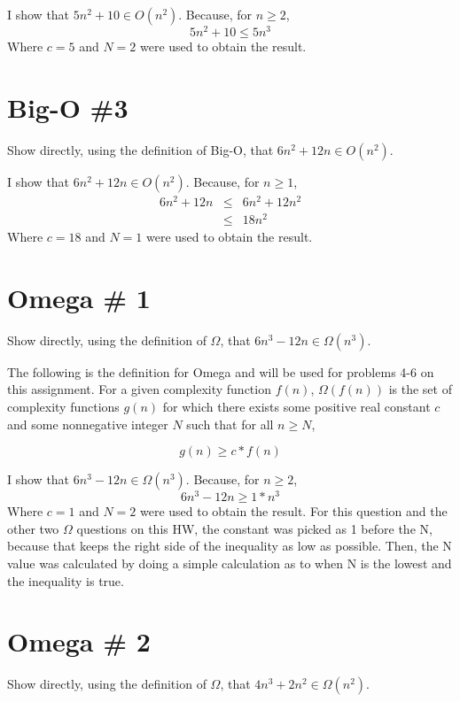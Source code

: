 \documentclass[11pt]{article}
\begin{document}
\noindent
I show that $5n^2+10 \in O(n^2)$. Because, for $n \geq 2$,
\begin{equation*}
5n^2 + 10 \leq 5n^3
\end{equation*}
Where $c=5$ and $N=2$ were used to obtain the result.


\section{Big-O \#3}
Show directly, using the definition of Big-O, that $6n^2+12n \in O(n^2)$.


\bigskip
\bigskip
\noindent
I show that $6n^2+12n \in O(n^2)$. Because, for $n \geq 1$,
\begin{eqnarray*}
6n^2 + 12n &\leq& 6n^2 + 12n^2 \\
&\leq& 18n^2
\end{eqnarray*}
Where $c=18$ and $N=1$ were used to obtain the result.

\section{Omega \# 1}
Show directly, using the definition of $\Omega$, that $6n^3-12n \in \Omega(n^3)$.


\bigskip
\bigskip
The following is the definition for Omega and will be used for problems 4-6 on this assignment. For a given complexity function $f(n)$, $\Omega(f(n))$ is the set of complexity functions $g(n)$ for which there exists some positive real constant $c$ and some nonnegative integer $N$ such that for all $n \geq N$,

\begin{equation*}
g(n) \geq c * f(n)
\end{equation*}

\bigskip
\bigskip
\noindent
I show that $6n^3-12n \in \Omega(n^3)$. Because, for $n \geq 2$,
\begin{equation*}
6n^3-12n \geq 1*n^3
\end{equation*}
Where $c=1$ and $N=2$ were used to obtain the result. For this question and the other two $\Omega$ questions on this HW, the constant was picked as 1 before the N, because that keeps the right side of the inequality as low as possible. Then, the N value was calculated by doing a simple calculation as to when N is the lowest and the inequality is true.

\section{Omega \# 2}
Show directly, using the definition of $\Omega$, that $4n^3+2n^2 \in \Omega(n^2)$.
\end{document}
